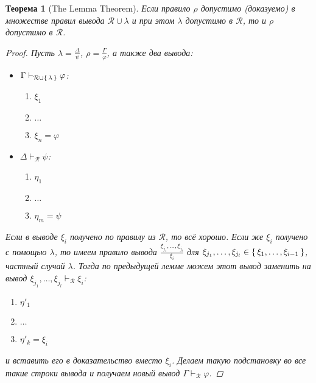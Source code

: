 \documentclass[12pt]{article}
\let\un\cup
\let\ds\displaystyle
\theoremstyle{definition}
\theoremstyle{plain}
\newtheorem{theorem}{Теорема}[section]
\theoremstyle{remark}
\begin{document}
\begin{theorem}[The Lemma Theorem]
  Если правило $\rho$ допустимо (доказуемо) в множестве правил вывода
  $\mathcal{R} \un \lambda$ и при этом $\lambda$ допустимо в
  $\mathcal{R}$, то и $\rho$ допустимо в $\mathcal{R}$.
  \begin{proof}
    Пусть $\ds\lambda = \frac{\Delta}{\psi}$, $\ds\rho =
    \frac{\Gamma}{\varphi}$, а также два вывода:
    \begin{itemize}
      \item $\Gamma \vdash_{\mathcal{R} \un \set{\lambda}} \varphi$:
        \begin{enumerate}
          \item $\xi_1$

          \item $\dots$

          \item $\xi_n = \varphi$
        \end{enumerate}

      \item $\Delta \vdash_{\mathcal{R}} \psi$:
        \begin{enumerate}
          \item $\eta_1$

          \item $\dots$

          \item $\eta_m = \psi$
        \end{enumerate}
    \end{itemize}
    Если в выводе $\xi_i$ получено по правилу из $\mathcal{R}$, то
    всё хорошо. Если же $\xi_i$ получено с помощью $\lambda$, то
    имеем правило вывода $\ds\frac{\xi_{j_1}, \dots,
    \xi_{j_l}}{\xi_i}$ для $\xi_{j_1}, \dots, \xi_{j_l} \in
    \set{\xi_1, \dots, \xi_{i-1}}$, частный случай $\lambda$. Тогда
    по предыдущей лемме можем этот вывод заменить на вывод
    $\xi_{j_1}, \dots, \xi_{j_l} \vdash_{\mathcal{R}} \xi_i$:
    \begin{enumerate}
      \item $\eta'_1$

      \item $\dots$

      \item $\eta'_k = \xi_i$
    \end{enumerate}
    и вставить его в доказательство вместо $\xi_i$. Делаем такую
    подстановку во все такие строки вывода и получаем новый вывод
    $\Gamma \vdash_{\mathcal{R}} \varphi$.
  \end{proof}
\end{theorem}
\end{document}
